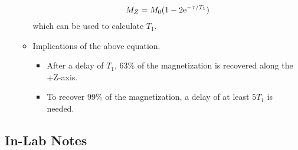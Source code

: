 \documentclass[../notes.tex]{subfiles}
\begin{document}
\begin{itemize}
\begin{itemize}
\begin{equation*}
            M_Z = M_0(1-2\e[-\tau/T_1])
        \end{equation*}
        which can be used to calculate $T_1$.
        \item Implications of the above equation.
        \begin{itemize}
            \item After a delay of $T_1$, 63\% of the magnetization is recovered along the +Z-axis.
            \item To recover 99\% of the magnetization, a delay of at least $5T_1$ is needed.
        \end{itemize}
    \end{itemize}
\end{itemize}


\subsection*{In-Lab Notes}
\end{document}
